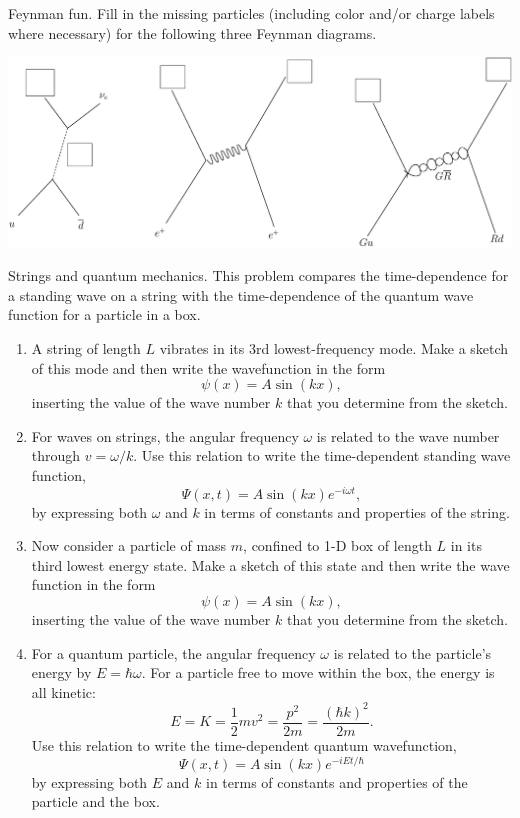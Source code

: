 \newpage

\begin{aproblem}{Feynman fun.}
  Fill in the missing particles (including color and/or charge labels
  where necessary) for the following three Feynman diagrams.
  \label{prob:Feynman_fun}
  \vspace{2mm}
  \begin{center}
    \includegraphics[width=5.4truein]{additional_problems/Feynman_fun}
  \end{center}
  \vspace{2mm}
\end{aproblem}

\begin{aproblem}{Strings and quantum mechanics.}
  This problem compares the time-dependence for a standing wave on a
  string with the time-dependence of the quantum wave function for a
  particle in a box.
  \begin{enumerate}
  \item A string of length $L$ vibrates in its 3rd lowest-frequency
    mode.  Make a sketch of this mode and then write the wavefunction
    in the form
    \[	
    \psi(x) = A \sin (kx),
    \]
    inserting the value of the wave number $k$ that you determine from
    the sketch.

  \item For waves on strings, the angular frequency $\omega$ is
    related to the wave number through $v = \omega / k$. Use this
    relation to write the time-dependent standing wave function,
    \[
    \Psi(x,t) = A \sin (kx) e^{-i\omega t},
    \]
    by expressing both $\omega$ and $k$ in terms of constants and
    properties of the string.

  \item Now consider a particle of mass $m$, confined to 1-D box of
    length $L$ in its third lowest energy state.  Make a sketch of
    this state and then write the wave function in the form
    \[
    \psi(x) = A \sin (kx),
    \]
    inserting the value of the wave number $k$ that you determine from
    the sketch.

  \item For a quantum particle, the angular frequency $\omega$ is
    related to the particle's energy by $E=\hbar\omega$.  For a
    particle free to move within the box, the energy is all kinetic:
    \[
    E=K = \frac{1}{2}mv^2 = \frac{p^2}{2m}= \frac{(\hbar k)^2}{2m}.
    \]
    Use this relation to write the time-dependent quantum
    wavefunction,
    \[
    \Psi(x,t) = A \sin (kx) e^{-iEt/\hbar}
    \]
    by expressing both $E$ and $k$ in terms of constants and
    properties of the particle and the box.
  \end{enumerate}
\end{aproblem}

